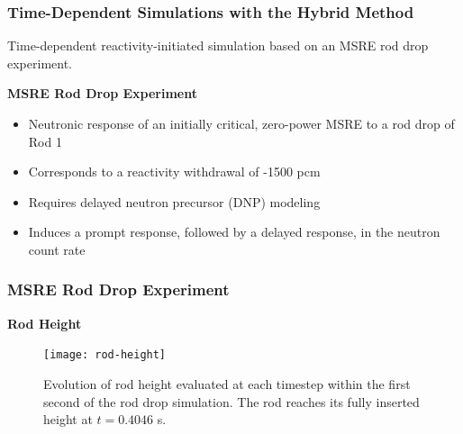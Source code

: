 \begin{frame}
  \frametitle{Time-Dependent Simulations with the Hybrid Method}
  Time-dependent reactivity-initiated simulation based on an MSRE rod drop experiment.
  \begin{block}{\textbf{MSRE Rod Drop Experiment}}
    \begin{itemize}
      \item Neutronic response of an initially critical, zero-power MSRE to a
        rod drop of Rod 1 \cite{prince_zero-power_1968}
      \item Corresponds to a reactivity withdrawal of -1500 pcm
      \item Requires delayed neutron precursor (DNP) modeling
      \item Induces a prompt response, followed by a delayed response, in the neutron count rate
    \end{itemize}
  \end{block}
\end{frame}

\begin{frame}
  \frametitle{MSRE Rod Drop Experiment}
  \textbf{Rod Height}
  \begin{figure}[htb!]
    \centering
    \texttt{[image: rod-height]}
    \caption{Evolution of rod height evaluated at each timestep within the first second of the rod
    drop simulation. The rod reaches its fully inserted height at $t=0.4046$ s.}
    \label{fig:rod-height}
  \end{figure}
\end{frame}

